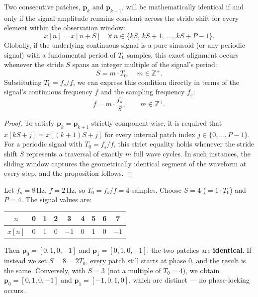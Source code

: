 \begin{proposition}
	Two consecutive patches, $\mathbf{p}_k$ and $\mathbf{p}_{k+1}$, will be
	mathematically identical if and only if the signal amplitude remains constant across
	the stride shift for every element within the observation window:
	\begin{equation}
		x[n] = x[n + S] \quad \forall\, n \in \{kS,\, kS+1,\, \ldots,\, kS+P-1\}.
	\end{equation}
	Globally, if the underlying continuous signal is a pure sinusoid (or any periodic
	signal) with a fundamental period of $T_0$ samples, this exact alignment occurs
	whenever the stride $S$ spans an integer multiple of the signal's period:
	\begin{equation}
		\boxed{S = m \cdot T_0, \quad m \in \mathbb{Z}^+.}
	\end{equation}
	Substituting $T_0 = f_s / f$, we can express this condition directly in terms of the
	signal's continuous frequency $f$ and the sampling frequency $f_s$:
	\begin{equation}
		f = m \cdot \frac{f_s}{S}, \qquad m \in \mathbb{Z}^+.
	\end{equation}
\end{proposition}

\begin{proof}
	To satisfy $\mathbf{p}_k = \mathbf{p}_{k+1}$ strictly component-wise, it is required
	that $x[kS + j] = x[(k+1)S + j]$ for every internal patch index
	$j \in \{0,\ldots,P-1\}$.
	For a periodic signal with $T_0 = f_s/f$, this strict equality holds whenever the
	stride shift $S$ represents a traversal of exactly $m$ full wave cycles.
	In such instances, the sliding window captures the geometrically identical segment of
	the waveform at every step, and the proposition follows.
\end{proof}

\begin{example}
	Let $f_s = 8\,\text{Hz}$, $f = 2\,\text{Hz}$, so $T_0 = f_s/f = 4$ samples.
	Choose $S = 4$ ($= 1 \cdot T_0$) and $P = 4$.  The signal values are:
	\begin{center}
		\begin{tabular}{c|cccccccc}
			$n$    & 0 & 1 & 2 & 3 & 4 & 5 & 6 & 7 \\\hline
			$x[n]$ & $0$ & $1$ & $0$ & $-1$ & $0$ & $1$ & $0$ & $-1$
		\end{tabular}
	\end{center}
	Then $\mathbf{p}_0 = [0,1,0,-1]$ and $\mathbf{p}_1 = [0,1,0,-1]$:
	the two patches are \textbf{identical}.
	If instead we set $S = 8 = 2T_0$, every patch still starts at phase $0$, and the
	result is the same.
	Conversely, with $S = 3$ (not a multiple of $T_0 = 4$), we obtain
	$\mathbf{p}_0 = [0,1,0,-1]$ and $\mathbf{p}_1 = [-1,0,1,0]$, which are distinct —
	no phase-locking occurs.
\end{example}

